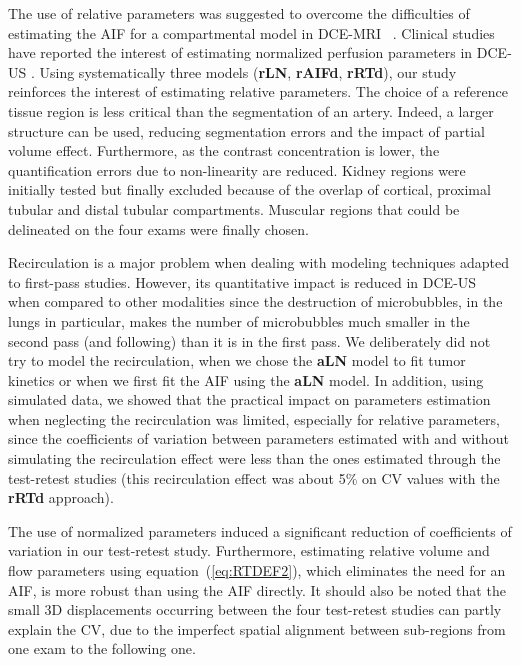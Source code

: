 The use of relative parameters was suggested to overcome the difficulties of estimating the AIF for a compartmental model in DCE-MRI ~\cite{Yankeelov2005de}. Clinical studies have reported the interest of estimating normalized perfusion parameters in DCE-US \cite{Guibal2010bl,Hoeffel2010ce,Lefort2012km}. Using systematically three models (\textbf{rLN}, \textbf{rAIFd}, \textbf{rRTd}), our study reinforces the interest of estimating relative parameters. The choice of a reference tissue region is less critical than the segmentation of an artery. Indeed, a larger structure can be used, reducing segmentation errors and the impact of partial volume effect. Furthermore, as the contrast concentration is lower, the quantification errors due to non-linearity are reduced. Kidney regions were initially tested but finally excluded because of the overlap of cortical, proximal tubular and distal tubular compartments. Muscular regions that could be delineated on the four exams were finally chosen.

Recirculation is a major problem when dealing with modeling techniques adapted to first-pass studies. However, its quantitative impact is reduced in DCE-US when compared to other modalities since the destruction of microbubbles, in the lungs in particular, makes the number of microbubbles much smaller in the second pass (and following) than it is in the first pass. We deliberately did not try to model the recirculation, when we chose the \textbf{aLN} model to fit tumor kinetics or when we first fit the AIF using the \textbf{aLN} model. In addition, using simulated data, we showed that the practical impact on parameters estimation when neglecting the recirculation was limited, especially for relative parameters, since the coefficients of variation between parameters estimated with and without simulating the recirculation effect were less than the ones estimated through the test-retest studies (this recirculation effect was about 5\% on CV values with the \textbf{rRTd} approach).

The use of normalized parameters induced a significant reduction of coefficients of variation in our test-retest study. 
Furthermore, estimating relative volume and flow parameters using equation~(\ref{eq:RTDEF2}), which eliminates the need for an AIF, is more robust than using the AIF directly. It should also be noted that the small 3D displacements occurring between the four test-retest studies can partly explain the CV, due to the imperfect spatial alignment between sub-regions from one exam to the following one.

